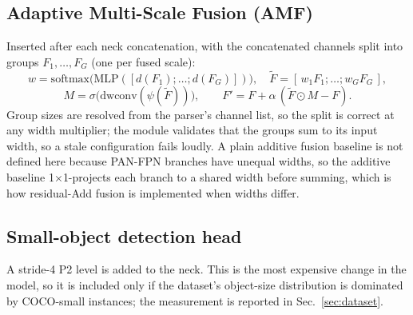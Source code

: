 \documentclass[10pt,twocolumn,letterpaper]{article}
\begin{document}
\subsection{Adaptive Multi-Scale Fusion (AMF)}
\label{sec:amf}
Inserted after each neck concatenation, with the concatenated channels split into
groups $F_1,\dots,F_G$ (one per fused scale):
\begin{equation}
w = \mathrm{softmax}\big(\mathrm{MLP}([d(F_1);\dots;d(F_G)])\big),\quad
\tilde{F} = [\,w_1F_1;\dots;w_GF_G\,],
\end{equation}
\begin{equation}
M = \sigma\big(\mathrm{dwconv}(\psi(\tilde F))\big),\qquad
F' = F + \alpha\,(\tilde F \odot M - F).
\end{equation}
Group sizes are resolved from the parser's channel list, so the split is correct
at any width multiplier; the module validates that the groups sum to its input
width, so a stale configuration fails loudly. A plain additive fusion baseline is
not defined here because PAN-FPN branches have unequal widths, so the additive
baseline 1$\times$1-projects each branch to a shared width before summing, which
is how residual-Add fusion is implemented when widths differ.

\subsection{Small-object detection head}
A stride-4 P2 level is added to the neck. This is the most expensive change in
the model, so it is included only if the dataset's object-size distribution is
dominated by COCO-small instances; the measurement is reported in
Sec.~\ref{sec:dataset}.
\end{document}
